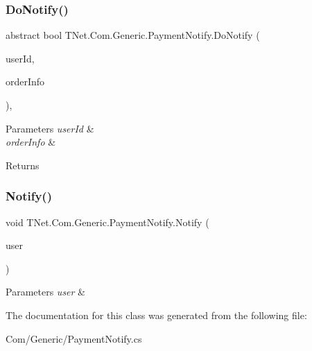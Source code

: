 \subsubsection{\texorpdfstring{Do\+Notify()}{DoNotify()}}
{\footnotesize\ttfamily abstract bool T\+Net.\+Com.\+Generic.\+Payment\+Notify.\+Do\+Notify (\begin{DoxyParamCaption}\item[{int}]{user\+Id,  }\item[{\mbox{\hyperlink{class_t_net_1_1_pay_1_1_order_info}{Order\+Info}}}]{order\+Info }\end{DoxyParamCaption})\hspace{0.3cm}{\ttfamily [protected]}, {}}






\begin{DoxyParams}{Parameters}
{\em user\+Id} & \\
\hline
{\em order\+Info} & \\
\hline
\end{DoxyParams}
\begin{DoxyReturn}{Returns}

\end{DoxyReturn}
\mbox{\label{class_t_net_1_1_com_1_1_generic_1_1_payment_notify_a2ba7548c8b0389f777292a065e00a682}} 
\subsubsection{\texorpdfstring{Notify()}{Notify()}}
{\footnotesize\ttfamily void T\+Net.\+Com.\+Generic.\+Payment\+Notify.\+Notify (\begin{DoxyParamCaption}\item[{\mbox{\hyperlink{interface_t_net_1_1_context___1_1_i_user}{I\+User}}}]{user }\end{DoxyParamCaption})}






\begin{DoxyParams}{Parameters}
{\em user} & \\
\hline
\end{DoxyParams}


The documentation for this class was generated from the following file\+:\begin{DoxyCompactItemize}
\item 
Com/\+Generic/Payment\+Notify.\+cs\end{DoxyCompactItemize}

